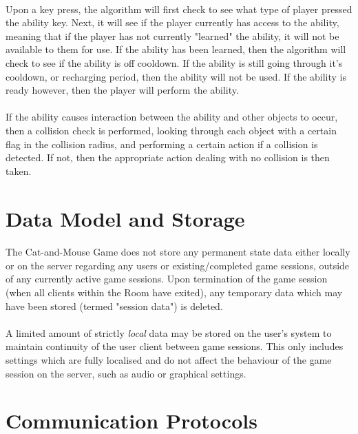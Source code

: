 \documentclass[12pt, titlepage]{article}
\begin{document}
\paragraph{}Upon a key press, the algorithm will first check to see what type of player pressed the ability key. Next, it will see if the player currently has access to the ability, meaning that if the player has not currently "learned" the ability, it will not be available to them for use. If the ability has been learned, then the algorithm will check to see if the ability is off cooldown. If the ability is still going through it's cooldown, or recharging period, then the ability will not be used. If the ability is ready however, then the player will perform the ability. 
\paragraph{}If the ability causes interaction between the ability and other objects to occur, then a collision check is performed, looking through each object with a certain flag in the collision radius, and performing a certain action if a collision is detected. If not, then the appropriate action dealing with no collision is then taken. 

\section{Data Model and Storage}
\paragraph{} The Cat-and-Mouse Game does not store any permanent state data either locally or on the server regarding any users or existing/completed game sessions, outside of any currently active game sessions. Upon termination of the game session (when all clients within the Room have exited), any temporary data which may have been stored (termed "session data") is deleted.
\paragraph{}A limited amount of strictly\emph{ local} data may be stored on the user's system to maintain continuity of the user client between game sessions. This only includes settings which are fully localised and do not affect the behaviour of the game session on the server, such as audio or graphical settings.

\section{Communication Protocols}
\end{document}
